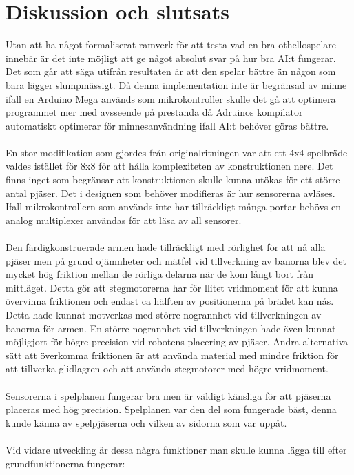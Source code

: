 \documentclass[a4paper]{article}
\begin{document}
\section{Diskussion och slutsats}
Utan att ha något formaliserat ramverk för att testa vad en bra othellospelare innebär är det inte möjligt att ge något absolut svar på hur bra AI:t fungerar.
Det som går att säga utifrån resultaten är att den spelar bättre än någon som bara lägger slumpmässigt. Då denna implementation inte är begränsad av minne ifall en Arduino Mega används som mikrokontroller skulle det gå att optimera programmet mer med avsseende på prestanda då Adruinos kompilator automatiskt optimerar för minnesanvändning ifall AI:t behöver göras bättre.
\\
\\
En stor modifikation som gjordes från originalritningen var att ett 4x4 spelbräde valdes istället för 8x8 för att hålla komplexiteten av konstruktionen nere.
Det finns inget som begränsar att konstruktionen skulle kunna utökas för ett större antal pjäser.
Det i designen som behöver modifieras är hur sensorerna avläses.
Ifall mikrokontrollern som används inte har tillräckligt många portar behövs en analog multiplexer användas  för att läsa av all sensorer.
\\
\\
Den färdigkonstruerade armen hade tillräckligt med rörlighet för att nå alla pjäser men på grund ojämnheter och mätfel vid tillverkning av banorna blev det mycket hög friktion mellan de rörliga delarna när de kom långt bort från mittläget.
Detta gör att stegmotorerna har för llitet vridmoment för att kunna övervinna friktionen och endast ca hälften av positionerna på brädet kan nås.
Detta hade kunnat motverkas med större nogrannhet vid tillverkningen av banorna för armen.
En större nogrannhet vid tillverkningen hade även kunnat möjligjort för högre precision vid robotens placering av pjäser.
Andra alternativa sätt att överkomma friktionen är att använda material med mindre friktion för att tillverka glidlagren och att använda stegmotorer med högre vridmoment.
\\
\\
Sensorerna i spelplanen fungerar bra men är väldigt känsliga för att pjäserna placeras med hög precision.
Spelplanen var den del som fungerade bäst, denna kunde känna av spelpjäserna och vilken av sidorna som var uppåt.
\\
\\
Vid vidare utveckling är dessa några funktioner man skulle kunna lägga till efter grundfunktionerna fungerar: 
\end{document}
